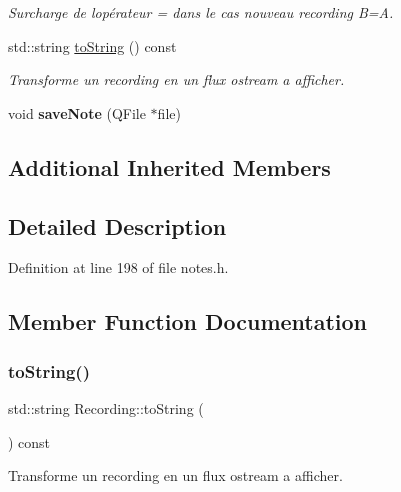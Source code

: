 \begin{DoxyCompactItemize}
\begin{DoxyCompactList}\small\item\em Surcharge de l\textquotesingle{}opérateur = dans le cas nouveau recording B=A. \end{DoxyCompactList}\item 
std\+::string \hyperlink{class_recording_a9f403a39bec2db40c9171a6c3a20942d}{to\+String} () const
\begin{DoxyCompactList}\small\item\em Transforme un recording en un flux ostream a afficher. \end{DoxyCompactList}\item 
\mbox{\label{class_recording_a99e10c8a8c13bce5f70195b6c30a1cc9}} 
void {\bfseries save\+Note} (Q\+File $\ast$file)
\end{DoxyCompactItemize}
\subsection*{Additional Inherited Members}


\subsection{Detailed Description}


Definition at line 198 of file notes.\+h.



\subsection{Member Function Documentation}
\mbox{\label{class_recording_a9f403a39bec2db40c9171a6c3a20942d}} 
\subsubsection{\texorpdfstring{to\+String()}{toString()}}
{\footnotesize\ttfamily std\+::string Recording\+::to\+String (\begin{DoxyParamCaption}{ }\end{DoxyParamCaption}) const\hspace{0.3cm}{\ttfamily [virtual]}}



Transforme un recording en un flux ostream a afficher. 

